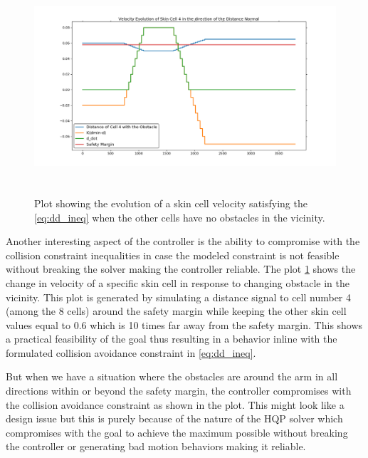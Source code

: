 \begin{figure}[H]
\centering
\includegraphics[width=18cm,height=8cm,center]{chapters/doa/images/delft/plot_satisfy.png}
\caption{Plot showing the evolution of a skin cell velocity satisfying the \ref{eq:dd_ineq} when the other cells have no obstacles in the vicinity.}
\label{fig:plotsatisfy}
\end{figure}

Another interesting aspect of the controller is the ability to compromise with the collision constraint inequalities in case the modeled constraint is not feasible without breaking the solver making the controller reliable. The plot \ref{fig:plotsatisfy} shows the change in velocity of a specific skin cell in response to changing obstacle in the vicinity. This plot is generated by simulating a distance signal to cell number 4 (among the 8 cells) around the safety margin while keeping the other skin cell values equal to 0.6 which is 10 times far away from the safety margin. This shows a practical feasibility of the goal thus resulting in a behavior inline with the formulated collision avoidance constraint in \ref{eq:dd_ineq}. 

But when we have a situation where the obstacles are around the arm in all directions within or beyond the safety margin, the controller compromises with the collision avoidance constraint as shown in the plot. This might look like a design issue but this is purely because of the nature of the HQP solver which compromises with the goal to achieve the maximum possible without breaking the controller or generating bad motion behaviors making it reliable. 

